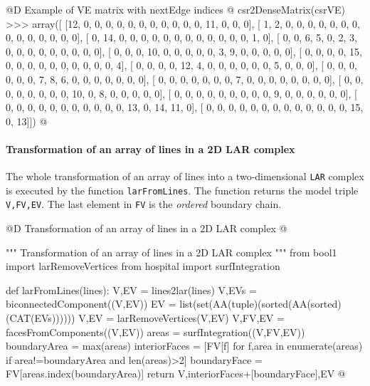 \documentclass[11pt,oneside]{article}    %
\begin{document}
@D Example of VE matrix with nextEdge indices @{
csr2DenseMatrix(csrVE)
>>> array([
    [12,  0,  0,  0,  0,  0,  0,  0,  0,  0,  0,  0, 11,  0,  0,  0], 
    [ 1,  2,  0,  0,  0,  0,  0,  0,  0,  0,  0,  0,  0,  0,  0,  0], 
    [ 0, 14,  0,  0,  0,  0,  0,  0,  0,  0,  0,  0,  0,  0,  1,  0], 
    [ 0,  0,  6,  5,  0,  2,  3,  0,  0,  0,  0,  0,  0,  0,  0,  0], 
    [ 0,  0,  0, 10,  0,  0,  0,  0,  0,  3,  9,  0,  0,  0,  0,  0], 
    [ 0,  0,  0,  0, 15,  0,  0,  0,  0,  0,  0,  0,  0,  0,  0,  4], 
    [ 0,  0,  0,  0, 12,  4,  0,  0,  0,  0,  0,  0,  5,  0,  0,  0], 
    [ 0,  0,  0,  0,  0,  0,  7,  8,  6,  0,  0,  0,  0,  0,  0,  0], 
    [ 0,  0,  0,  0,  0,  0,  0,  7,  0,  0,  0,  0,  0,  0,  0,  0], 
    [ 0,  0,  0,  0,  0,  0,  0,  0, 10,  0,  8,  0,  0,  0,  0,  0], 
    [ 0,  0,  0,  0,  0,  0,  0,  0,  0,  9,  0,  0,  0,  0,  0,  0], 
    [ 0,  0,  0,  0,  0,  0,  0,  0,  0,  0,  0, 13,  0, 14, 11,  0], 
    [ 0,  0,  0,  0,  0,  0,  0,  0,  0,  0,  0,  0,  0, 15,  0, 13]])
@}



\paragraph{Transformation of an array of lines in a 2D LAR complex}

The whole transformation of an array of lines into a two-dimensional \texttt{LAR} complex is executed by the function \texttt{larFromLines}. The function returns the model triple \texttt{V,FV,EV}. The last element in \texttt{FV} is the \emph{ordered} boundary chain.


@D Transformation of an array of lines in a 2D LAR complex @{
""" Transformation of an array of lines in a 2D LAR complex """
from bool1 import larRemoveVertices
from hospital import surfIntegration

def larFromLines(lines):
    V,EV = lines2lar(lines)
    V,EVs = biconnectedComponent((V,EV))
    EV = list(set(AA(tuple)(sorted(AA(sorted)(CAT(EVs)))))) 
    V,EV = larRemoveVertices(V,EV)
    V,FV,EV = facesFromComponents((V,EV))
    areas = surfIntegration((V,FV,EV))
    boundaryArea = max(areas)
    interiorFaces = [FV[f] for f,area in enumerate(areas) if area!=boundaryArea and len(areas)>2]
    boundaryFace = FV[areas.index(boundaryArea)]
    return V,interiorFaces+[boundaryFace],EV
@}
\end{document}
